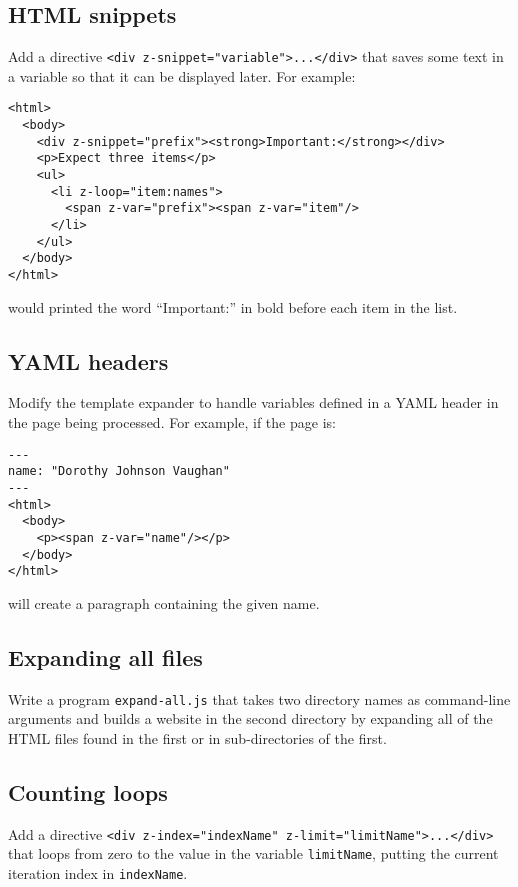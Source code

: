 \documentclass[krantzl]{krantz}
\begin{document}
\subsection*{HTML snippets}


Add a directive \texttt{<div z-snippet="variable">...</div>} that saves some text in a variable
so that it can be displayed later.
For example:

\begin{lstlisting}[frame=tblr]
<html>
  <body>
    <div z-snippet="prefix"><strong>Important:</strong></div>
    <p>Expect three items</p>
    <ul>
      <li z-loop="item:names">
        <span z-var="prefix"><span z-var="item"/>
      </li>
    </ul>
  </body>
</html>
\end{lstlisting}


\noindent would printed the word “Important:” in bold before each item in the list.

\subsection*{YAML headers}


Modify the template expander to handle variables defined in a YAML header in the page being processed.
For example, if the page is:

\begin{lstlisting}[frame=tblr]
---
name: "Dorothy Johnson Vaughan"
---
<html>
  <body>
    <p><span z-var="name"/></p>
  </body>
</html>
\end{lstlisting}


\noindent will create a paragraph containing the given name.

\subsection*{Expanding all files}


Write a program \texttt{expand-all.js} that takes two directory names as command-line arguments
and builds a website in the second directory by expanding all of the HTML files found in the first
or in sub-directories of the first.

\subsection*{Counting loops}


Add a directive \texttt{<div z-index="indexName" z-limit="limitName">...</div>}
that loops from zero to the value in the variable \texttt{limitName},
putting the current iteration index in \texttt{indexName}.
\end{document}
